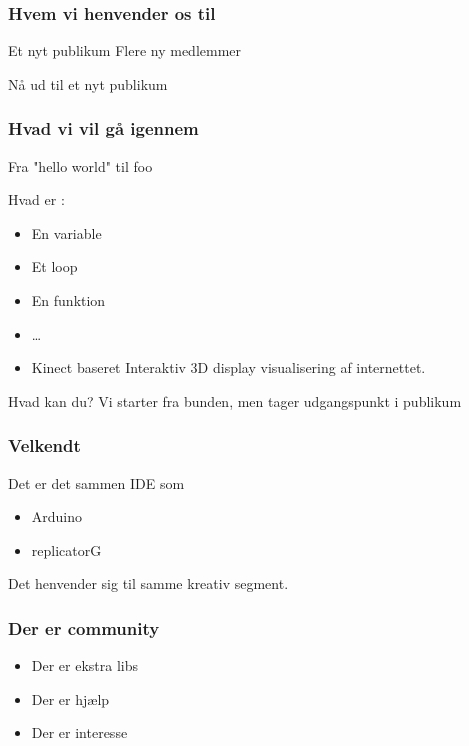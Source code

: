 \documentclass{beamer}
\begin{document}
\begin{frame}
  \frametitle{Hvem vi henvender os til}
  \begin{block}{Et nyt publikum}
    Flere ny medlemmer 

    Nå ud til et nyt publikum

\end{block}
  
\end{frame}

\begin{frame}
  \frametitle{Hvad vi vil gå igennem}
  Fra "hello world" til foo

  Hvad er :
  \begin{itemize}
  \item En variable
  \item Et loop
  \item En funktion
  \item \ldots{}
  \item Kinect baseret Interaktiv 3D display visualisering af internettet.
  \end{itemize}
  
  \begin{block}{Hvad kan du?}
    Vi starter fra bunden, men tager udgangspunkt i publikum
  \end{block}


\end{frame}


\begin{frame}
  \frametitle{Velkendt}
   Det er det sammen IDE som
   \begin{itemize}
   \item Arduino
   \item replicatorG
   \end{itemize}

   Det henvender sig til samme kreativ segment.

 \end{frame}
 
 \begin{frame}
   \frametitle{Der er community}
   
   \begin{itemize}
   \item Der er ekstra libs
   \item Der er hjælp
   \item Der er interesse
   \end{itemize}
   
 \end{frame}
 
\end{document}
